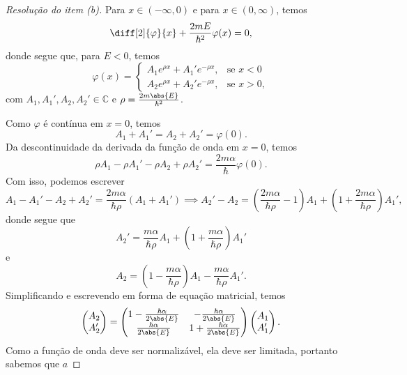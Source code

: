 \begin{proof}[Resolução do item (b)]
    Para \(x \in (-\infty, 0)\) e para \(x \in (0, \infty)\), temos
    \begin{equation*}
        \diff[2]{\varphi}{x} + \frac{2m E}{\hbar^2}\varphi(x) = 0,
    \end{equation*}
    donde segue que, para \(E < 0\), temos
    \begin{equation*}
        \varphi(x) = \begin{cases}
            \displaystyle A_1 e^{\rho x} + A_1' e^{-\rho x},&\text{se }x < 0\\
            \displaystyle A_2 e^{\rho x} + A_2' e^{-\rho x},&\text{se }x > 0,
        \end{cases}
    \end{equation*}
    com \(A_1, A_1', A_2, A_2' \in \mathbb{C}\) e \(\rho = \frac{2m\abs{E}}{\hbar^2}\).

    Como \(\varphi\) é contínua em \(x = 0\), temos
    \begin{equation*}
        A_1 + A_1' = A_2 + A_2' = \varphi(0).
    \end{equation*}
    Da descontinuidade da derivada da função de onda em \(x = 0\), temos
    \begin{equation*}
        \rho A_1 - \rho A_1' - \rho A_2 + \rho A_2' = \frac{2m \alpha}{\hbar} \varphi(0).
    \end{equation*}
    Com isso, podemos escrever
    \begin{equation*}
        A_1 - A_1' - A_2 + A_2' = \frac{2m \alpha}{\hbar \rho} (A_1 + A_1') \implies A_2' - A_2 = \left(\frac{2m \alpha}{\hbar \rho} - 1\right)A_1 + \left(1 + \frac{2m \alpha}{\hbar \rho}\right)A_1',
    \end{equation*}
    donde segue que
    \begin{equation*}
        A_2' = \frac{m \alpha}{\hbar \rho} A_1 + \left(1 + \frac{m \alpha}{\hbar \rho}\right)A_1'
    \end{equation*}
    e
    \begin{equation*}
        A_2 = \left(1 - \frac{m \alpha}{\hbar \rho}\right) A_1 - \frac{m \alpha}{\hbar \rho} A_1'.
    \end{equation*}
    Simplificando e escrevendo em forma de equação matricial, temos
    \begin{equation*}
        \begin{pmatrix}
            A_2\\A_2'
        \end{pmatrix} =
        \begin{pmatrix}
            1 - \frac{\hbar \alpha}{2\abs{E}} & - \frac{\hbar \alpha}{2\abs{E}}\\
            \frac{\hbar \alpha}{2\abs{E}} & 1 + \frac{\hbar \alpha}{2\abs{E}}
        \end{pmatrix}
        \begin{pmatrix}
            A_1\\A_1'
        \end{pmatrix}.
    \end{equation*}
    Como a função de onda deve ser normalizável, ela deve ser limitada, portanto sabemos que \(a\)
\end{proof}
